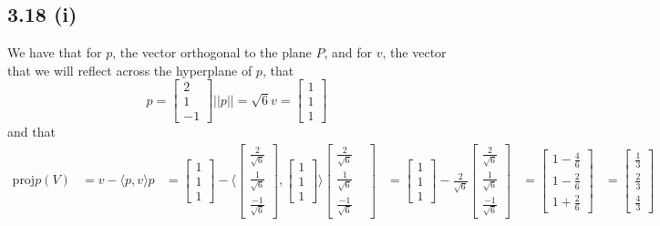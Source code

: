 \documentclass[letterpaper,12pt]{article}
\theoremstyle{definition}
\begin{document}
\subsection*{3.18 (i)}
We have that for $p$, the vector orthogonal to the plane $P$, and for $v$, the vector that we will reflect across the hyperplane of $p$, that
\[ p = 
\begin{bmatrix}
    2\\1\\-1
\end{bmatrix}
||p|| = \sqrt{6}
v = 
\begin{bmatrix}
    1\\1\\1
\end{bmatrix}
\]
and that
\begin{align*}
    \text{proj}p(V) &= v - \langle p,v \rangle p &= 
    \begin{bmatrix}
        1\\1\\1
    \end{bmatrix}
    - \langle 
    \begin{bmatrix}
        \frac{2}{\sqrt{6}}\\\frac{1}{\sqrt{6}}\\\frac{-1}{\sqrt{6}}
    \end{bmatrix},
    \begin{bmatrix}
        1\\1\\1
    \end{bmatrix}\rangle
    \begin{bmatrix}
        \frac{2}{\sqrt{6}}\\\frac{1}{\sqrt{6}}\\\frac{-1}{\sqrt{6}} &
    \end{bmatrix}
    &=
    \begin{bmatrix}
        1\\1\\1
    \end{bmatrix}
    - \frac{2}{\sqrt{6}} 
    \begin{bmatrix}
        \frac{2}{\sqrt{6}}\\\frac{1}{\sqrt{6}}\\\frac{-1}{\sqrt{6}}
    \end{bmatrix}
    &= 
    \begin{bmatrix}
        1-\frac{4}{6} \\ 1 - \frac{2}{6} \\ 1+ \frac{2}{6}
    \end{bmatrix}
    &=
    \begin{bmatrix}
        \frac{1}{3} \\ \frac{2}{3} \\ \frac{4}{3}
    \end{bmatrix}
\end{align*}
\end{document}

